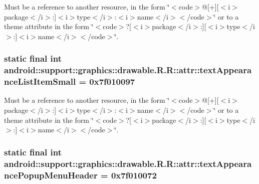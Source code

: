 Must be a reference to another resource, in the form \char`\"{}$<$code$>$@\mbox{[}+\mbox{]}\mbox{[}$<$i$>$package$<$/i$>$:\mbox{]}$<$i$>$type$<$/i$>$:$<$i$>$name$<$/i$>$$<$/code$>$\char`\"{} or to a theme attribute in the form \char`\"{}$<$code$>$?\mbox{[}$<$i$>$package$<$/i$>$:\mbox{]}\mbox{[}$<$i$>$type$<$/i$>$:\mbox{]}$<$i$>$name$<$/i$>$$<$/code$>$\char`\"{}. \hypertarget{classandroid_1_1support_1_1graphics_1_1drawable_1_1_r_1_1attr_818fb88cd64d4f9501d4f3520136640e}{
\subsubsection[{textAppearanceListItemSmall}]{\setlength{\rightskip}{0pt plus 5cm}static final int android::support::graphics::drawable.R.R::attr::textAppearanceListItemSmall = 0x7f010097}}
\label{classandroid_1_1support_1_1graphics_1_1drawable_1_1_r_1_1attr_818fb88cd64d4f9501d4f3520136640e}


Must be a reference to another resource, in the form \char`\"{}$<$code$>$@\mbox{[}+\mbox{]}\mbox{[}$<$i$>$package$<$/i$>$:\mbox{]}$<$i$>$type$<$/i$>$:$<$i$>$name$<$/i$>$$<$/code$>$\char`\"{} or to a theme attribute in the form \char`\"{}$<$code$>$?\mbox{[}$<$i$>$package$<$/i$>$:\mbox{]}\mbox{[}$<$i$>$type$<$/i$>$:\mbox{]}$<$i$>$name$<$/i$>$$<$/code$>$\char`\"{}. \hypertarget{classandroid_1_1support_1_1graphics_1_1drawable_1_1_r_1_1attr_09a48b76e400c8571acd1cbff0cf352c}{
\subsubsection[{textAppearancePopupMenuHeader}]{\setlength{\rightskip}{0pt plus 5cm}static final int android::support::graphics::drawable.R.R::attr::textAppearancePopupMenuHeader = 0x7f010072}}
\label{classandroid_1_1support_1_1graphics_1_1drawable_1_1_r_1_1attr_09a48b76e400c8571acd1cbff0cf352c}


